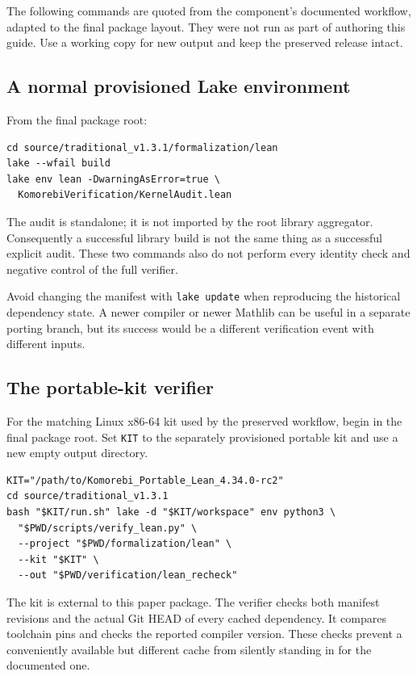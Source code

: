 \documentclass[11pt,a4paper]{article}
\newcommand{\code}[1]{\nolinkurl{#1}}
\begin{document}
The following commands are quoted from the component's documented workflow, adapted to the final package layout. They were not run as part of authoring this guide. Use a working copy for new output and keep the preserved release intact.

\subsection{A normal provisioned Lake environment}

From the final package root:
\begin{lstlisting}
cd source/traditional_v1.3.1/formalization/lean
lake --wfail build
lake env lean -DwarningAsError=true \
  KomorebiVerification/KernelAudit.lean
\end{lstlisting}

The audit is standalone; it is not imported by the root library aggregator. Consequently a successful library build is not the same thing as a successful explicit audit. These two commands also do not perform every identity check and negative control of the full verifier.

Avoid changing the manifest with \code{lake update} when reproducing the historical dependency state. A newer compiler or newer Mathlib can be useful in a separate porting branch, but its success would be a different verification event with different inputs.

\subsection{The portable-kit verifier}

For the matching Linux x86-64 kit used by the preserved workflow, begin in the final package root. Set \code{KIT} to the separately provisioned portable kit and use a new empty output directory.
\begin{lstlisting}
KIT="/path/to/Komorebi_Portable_Lean_4.34.0-rc2"
cd source/traditional_v1.3.1
bash "$KIT/run.sh" lake -d "$KIT/workspace" env python3 \
  "$PWD/scripts/verify_lean.py" \
  --project "$PWD/formalization/lean" \
  --kit "$KIT" \
  --out "$PWD/verification/lean_recheck"
\end{lstlisting}

The kit is external to this paper package. The verifier checks both manifest revisions and the actual Git HEAD of every cached dependency. It compares toolchain pins and checks the reported compiler version. These checks prevent a conveniently available but different cache from silently standing in for the documented one.
\end{document}
